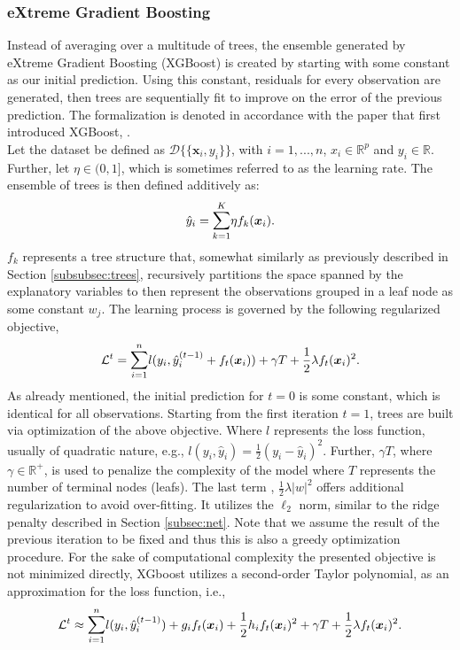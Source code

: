 \documentclass[a4paper,12pt, headsepline]{scrartcl}
\numberwithin{equation}{section}
\begin{document}
\subsubsection{eXtreme Gradient Boosting}\label{subsubsec:xgb}
Instead of averaging over a multitude of trees, the ensemble generated by eXtreme Gradient Boosting (XGBoost) is created by starting with some constant as our initial prediction. Using this constant, residuals for every observation are generated, then trees are sequentially fit to improve on the error of the previous prediction. The formalization is denoted in accordance with the paper that first introduced XGBoost, \citet{chen2016}.\\
Let the dataset be defined as $\mathcal{D}\{\{\bm x_i, y_i\}\}$, with $i = 1, ..., n$, $x_i \in \mathbb{R}^p$ and $y_i \in \mathbb{R}$. Further, let $\eta \in (0, 1]$, which is sometimes referred to as the learning rate. The ensemble of trees is then defined additively as:
\[
\hat y_i = \mathlarger{\sum}\limits_{k = 1}^K \eta f_k(\bm x_i).
\]
$f_k$ represents a tree structure that, somewhat similarly as previously described in Section \ref{subsubsec:trees}, recursively partitions the space spanned by the explanatory variables to then represent the observations grouped in a leaf node as some constant $w_j$. The learning process is governed by the following regularized objective,
\[
\mathcal{L}^t = \mathlarger{\sum}\limits_{i = 1}^n l( y_i, \hat y_i^{(t - 1)} + f_t(\bm x_i)) + \gamma T + \frac{1}{2}\lambda f_t(\bm x_i)^2.
\]
As already mentioned, the initial prediction for $t = 0$ is some constant, which is identical for all observations. Starting from the first iteration $t = 1$, trees are built via optimization of the above objective. Where $l$ represents the loss function, usually of quadratic nature, e.g., $l(y_i, \hat y_i) = \frac{1}{2} (y_i - \hat y_i)^2$. Further, $\gamma T$, where $\gamma \in \mathbb{R}^+$, is used to penalize the complexity of the model where $T$ represents the number of terminal nodes (leafs). The last term , $\frac{1}{2}\lambda|w|^2$ offers additional regularization to avoid over-fitting. It utilizes the $\ell_2$ norm, similar to the ridge penalty described in Section \ref{subsec:net}. Note that we assume the result of the previous iteration to be fixed and thus this is also a greedy optimization procedure. For the sake of computational complexity the presented objective is not minimized directly, XGboost utilizes a second-order Taylor polynomial, as an approximation for the loss function, i.e.,
\[
\mathcal{L}^t \approx \mathlarger{\sum}\limits_{i = 1}^n l( y_i, \hat y_i^{(t - 1)}) + g_i f_t(\bm x_i) + \frac{1}{2}h_i f_t( \bm x_i)^2 + \gamma T + \frac{1}{2}\lambda f_t(\bm x_i)^2.
\]
\end{document}
